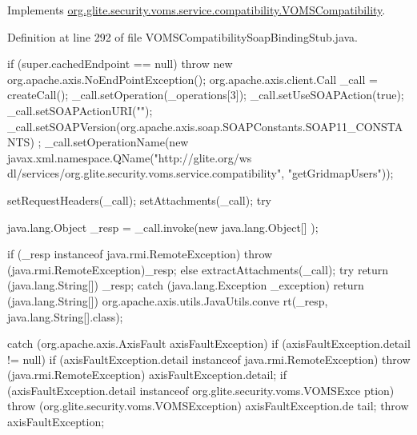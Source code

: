 Implements \hyperlink{interfaceorg_1_1glite_1_1security_1_1voms_1_1service_1_1compatibility_1_1VOMSCompatibility_a5785760300214415198b4821a543a2a6}{org.glite.security.voms.service.compatibility.VOMSCompatibility}.



Definition at line 292 of file VOMSCompatibilitySoapBindingStub.java.


\begin{DoxyCode}
                                                                                 
                                            {
        if (super.cachedEndpoint == null) {
            throw new org.apache.axis.NoEndPointException();
        }
        org.apache.axis.client.Call _call = createCall();
        _call.setOperation(_operations[3]);
        _call.setUseSOAPAction(true);
        _call.setSOAPActionURI("");
        _call.setSOAPVersion(org.apache.axis.soap.SOAPConstants.SOAP11_CONSTANTS)
      ;
        _call.setOperationName(new javax.xml.namespace.QName("http://glite.org/ws
      dl/services/org.glite.security.voms.service.compatibility", "getGridmapUsers"));

        setRequestHeaders(_call);
        setAttachments(_call);
 try {        java.lang.Object _resp = _call.invoke(new java.lang.Object[] {});

        if (_resp instanceof java.rmi.RemoteException) {
            throw (java.rmi.RemoteException)_resp;
        }
        else {
            extractAttachments(_call);
            try {
                return (java.lang.String[]) _resp;
            } catch (java.lang.Exception _exception) {
                return (java.lang.String[]) org.apache.axis.utils.JavaUtils.conve
      rt(_resp, java.lang.String[].class);
            }
        }
  } catch (org.apache.axis.AxisFault axisFaultException) {
    if (axisFaultException.detail != null) {
        if (axisFaultException.detail instanceof java.rmi.RemoteException) {
              throw (java.rmi.RemoteException) axisFaultException.detail;
         }
        if (axisFaultException.detail instanceof org.glite.security.voms.VOMSExce
      ption) {
              throw (org.glite.security.voms.VOMSException) axisFaultException.de
      tail;
         }
   }
  throw axisFaultException;
}
    }
\end{DoxyCode}
